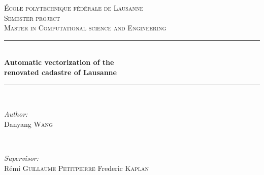 \begin{titlepage}
    \newcommand{\HRule}{\rule{\linewidth}{0.5mm}} %
    
    \center %
     
    
    \vspace{3cm}
    \textsc{\LARGE École polytechnique fédérale de Lausanne}\\[1.5cm] %
    \textsc{\Large Semester project}\\[0.5cm] %
    \textsc{\large Master in Computational science and Engineering}\\[0.5cm] %
    
    
    \HRule \\[0.4cm] %
    { \huge \bfseries Automatic vectorization of the  \\ renovated cadastre of Lausanne}\\[0.4cm] %
    \HRule \\[1.5cm]
     
    
    \begin{minipage}{0.4\textwidth}
    \begin{flushleft} \large
    \emph{Author:}\\
    Danyang \textsc{Wang} %
    \end{flushleft}
    \end{minipage}
    ~
    \begin{minipage}{0.4\textwidth}
    \begin{flushright} \large
    \emph{Supervisor:} \\
    Rémi \textsc{Guillaume Petitpierre}
    Frederic \textsc{Kaplan} %
    \end{flushright}
    \end{minipage}\\[10cm]
    

\end{titlepage}
